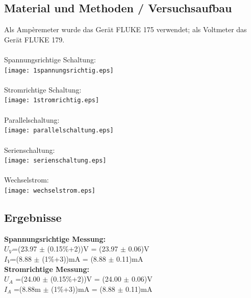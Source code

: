 \documentclass{article}
\begin{document}
\subsection{Material und Methoden / Versuchsaufbau}
Als Ampèremeter wurde das Gerät FLUKE 175 verwendet; als Voltmeter das Gerät FLUKE 179.\\
\\
Spannungsrichtige Schaltung:\\
\texttt{[image: 1spannungsrichtig.eps]}\\
\\
Stromrichtige Schaltung:\\
\texttt{[image: 1stromrichtig.eps]}\\
\\
Parallelschaltung:\\
\texttt{[image: parallelschaltung.eps]}\\
\\
Serienschaltung:\\
\texttt{[image: serienschaltung.eps]}\\
\\
Wechselstrom:\\
\texttt{[image: wechselstrom.eps]}\\

\subsection{Ergebnisse}
\textbf{Spannungsrichtige Messung:}\\
$U_V$=(23.97 $\pm$ (0.15\%+2))V = (23.97 $\pm$ 0.06)V\\
$I_V$=(8.88 $\pm$ (1\%+3))mA = (8.88 $\pm$ 0.11)mA\\

\textbf{Stromrichtige Messung:}\\
$U_A$ =(24.00 $\pm$ (0.15\%+2))V = (24.00 $\pm$ 0.06)V\\
$I_A$ =(8.88m $\pm$ (1\%+3))mA = (8.88 $\pm$ 0.11)mA\\
\end{document}
